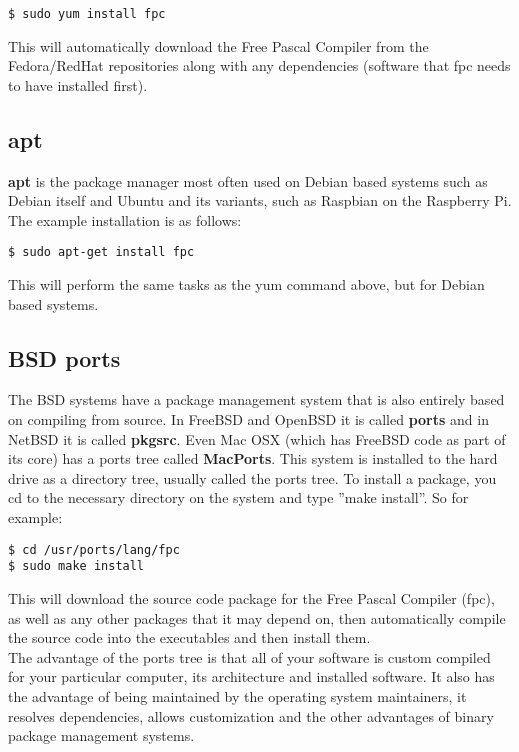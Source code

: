 \begin{verbatim}
$ sudo yum install fpc
\end{verbatim}

This will automatically download the Free Pascal Compiler from the Fedora/RedHat repositories along with any dependencies (software that fpc needs to have installed first).

\subsection{apt}

\textbf{apt} is the package manager most often used on Debian based systems such as Debian itself and Ubuntu and its variants, such as Raspbian on the Raspberry Pi.  The example installation is as follows:

\begin{verbatim}
$ sudo apt-get install fpc
\end{verbatim}

This will perform the same tasks as the yum command above, but for Debian based systems.

\subsection{BSD ports}

The BSD systems have a package management system that is also entirely based on compiling from source.  In FreeBSD and OpenBSD it is called \textbf{ports} and in NetBSD it is called \textbf{pkgsrc}.  Even Mac OSX (which has FreeBSD code as part of its core) has a ports tree called \textbf{MacPorts}.  This system is installed to the hard drive as a directory tree, usually called the ports tree.  To install a package, you cd to the necessary directory on the system and type ''make install''.  So for example:

\begin{verbatim}
$ cd /usr/ports/lang/fpc
$ sudo make install
\end{verbatim}

This will download the source code package for the Free Pascal Compiler (fpc), as well as any other packages that it may depend on, then automatically compile the source code into the executables and then install them.\\

The advantage of the ports tree is that all of your software is custom compiled for your particular computer, its architecture and installed software.  It also has the advantage of being maintained by the operating system maintainers, it resolves dependencies, allows customization and the other advantages of binary package management systems.\\

